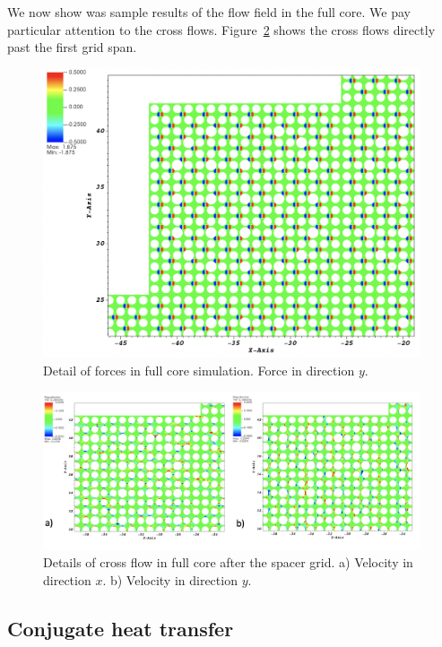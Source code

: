 We now show was sample results of the flow field in the full core. We pay particular attention to the cross flows. Figure~\ref{fig:msm1} shows the cross flows directly past the first grid span.

\begin{figure}[!ht]
\centering
\includegraphics[width=0.99\textwidth]{./figures/1span_msm.png}
\caption{Detail of forces in full core simulation. Force in direction $y$. }
\label{fig:msm}
\end{figure}

\begin{figure}[!ht]
\centering
\includegraphics[width=0.99\textwidth]{./figures/1span_msm_v1.png}
\caption{Details of cross flow in full core after the spacer grid. a) Velocity in direction $x$. b) Velocity in direction $y$. }
\label{fig:msm1}
\end{figure}

\subsection{Conjugate heat transfer}
\label{sec:results4}

